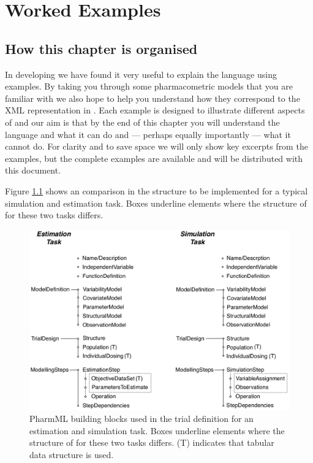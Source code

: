 \chapter{Worked Examples}
\label{chap:worked-egs}

\section{How this chapter is organised}

In developing \pharmml we have found it very useful to explain the
language using examples. By taking you through some pharmacometric models
that you are familiar with we also hope to help you understand how they
correspond to the XML representation in \pharmml. Each example is designed
to illustrate different aspects of \pharmml and our aim is that by the
end of this chapter you will understand the language and what it can
do and --- perhaps equally importantly --- what it cannot do. For
clarity and to save space we will only show key excerpts from the
examples, but the complete examples are available and will be
distributed with this document.

Figure \ref{fig:simEstTasks_List} shows an comparison in the 
structure to be implemented for a typical simulation and estimation task.
Boxes underline elements where the structure of \pharmml for these two tasks differs.

\begin{figure}[htb]
 \centering	
 \includegraphics[width=0.8\linewidth]{pics/simEstTasks_List}%
 \caption{PharmML building blocks used in the trial definition for an estimation and simulation task. 
 Boxes underline elements where the structure of \pharmml for these two tasks differs. (T) indicates 
 that tabular data structure is used.}
 \label{fig:simEstTasks_List}
 \end{figure}


